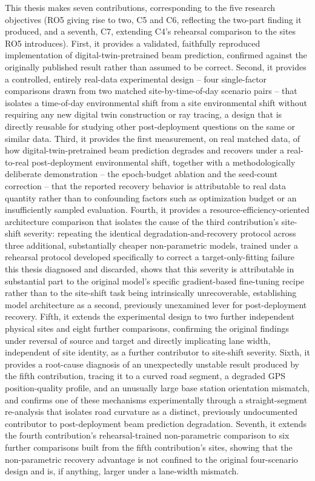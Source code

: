 \documentclass{iutbscthesis}
\begin{document}
This thesis makes seven contributions, corresponding to the five research objectives (RO5 giving rise to two, C5 and C6, reflecting the two-part finding it produced, and a seventh, C7, extending C4's rehearsal comparison to the sites RO5 introduces). First, it provides a validated, faithfully reproduced implementation of digital-twin-pretrained beam prediction, confirmed against the originally published result rather than assumed to be correct. Second, it provides a controlled, entirely real-data experimental design -- four single-factor comparisons drawn from two matched site-by-time-of-day scenario pairs -- that isolates a time-of-day environmental shift from a site environmental shift without requiring any new digital twin construction or ray tracing, a design that is directly reusable for studying other post-deployment questions on the same or similar data. Third, it provides the first measurement, on real matched data, of how digital-twin-pretrained beam prediction degrades and recovers under a real-to-real post-deployment environmental shift, together with a methodologically deliberate demonstration -- the epoch-budget ablation and the seed-count correction -- that the reported recovery behavior is attributable to real data quantity rather than to confounding factors such as optimization budget or an insufficiently sampled evaluation. Fourth, it provides a resource-efficiency-oriented architecture comparison that isolates the cause of the third contribution's site-shift severity: repeating the identical degradation-and-recovery protocol across three additional, substantially cheaper non-parametric models, trained under a rehearsal protocol developed specifically to correct a target-only-fitting failure this thesis diagnosed and discarded, shows that this severity is attributable in substantial part to the original model's specific gradient-based fine-tuning recipe rather than to the site-shift task being intrinsically unrecoverable, establishing model architecture as a second, previously unexamined lever for post-deployment recovery. Fifth, it extends the experimental design to two further independent physical sites and eight further comparisons, confirming the original findings under reversal of source and target and directly implicating lane width, independent of site identity, as a further contributor to site-shift severity. Sixth, it provides a root-cause diagnosis of an unexpectedly unstable result produced by the fifth contribution, tracing it to a curved road segment, a degraded GPS position-quality profile, and an unusually large base station orientation mismatch, and confirms one of these mechanisms experimentally through a straight-segment re-analysis that isolates road curvature as a distinct, previously undocumented contributor to post-deployment beam prediction degradation. Seventh, it extends the fourth contribution's rehearsal-trained non-parametric comparison to six further comparisons built from the fifth contribution's sites, showing that the non-parametric recovery advantage is not confined to the original four-scenario design and is, if anything, larger under a lane-width mismatch.
\end{document}
